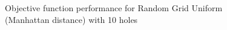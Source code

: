 \begin{figure}[H]
\begin{minipage}{.5\linewidth}
\end{minipage}%
\begin{minipage}{.5\linewidth}
\centering
{}
\end{minipage}\par\medskip

\caption{Objective function performance for Random Grid Uniform (Manhattan
  distance) with 10 holes}
\label{fig:obj-fixed}
\end{figure}



